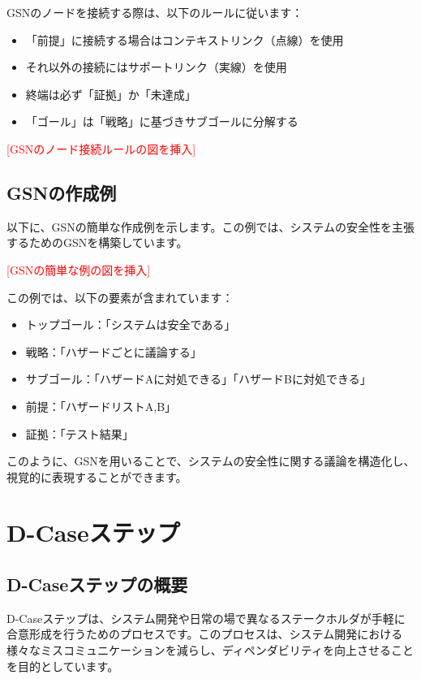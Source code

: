 GSNのノードを接続する際は、以下のルールに従います：

\begin{itemize}
    \item 「前提」に接続する場合はコンテキストリンク（点線）を使用
    \item それ以外の接続にはサポートリンク（実線）を使用
    \item 終端は必ず「証拠」か「未達成」
    \item 「ゴール」は「戦略」に基づきサブゴールに分解する
\end{itemize}

\textcolor{red}{[GSNのノード接続ルールの図を挿入]}

\subsection{GSNの作成例}

以下に、GSNの簡単な作成例を示します。この例では、システムの安全性を主張するためのGSNを構築しています。

\textcolor{red}{[GSNの簡単な例の図を挿入]}

この例では、以下の要素が含まれています：

\begin{itemize}
    \item トップゴール：「システムは安全である」
    \item 戦略：「ハザードごとに議論する」
    \item サブゴール：「ハザードAに対処できる」「ハザードBに対処できる」
    \item 前提：「ハザードリストA,B」
    \item 証拠：「テスト結果」
\end{itemize}

このように、GSNを用いることで、システムの安全性に関する議論を構造化し、視覚的に表現することができます。

\section{D-Caseステップ}

\subsection{D-Caseステップの概要}

D-Caseステップは、システム開発や日常の場で異なるステークホルダが手軽に合意形成を行うためのプロセスです。このプロセスは、システム開発における様々なミスコミュニケーションを減らし、ディペンダビリティを向上させることを目的としています。

